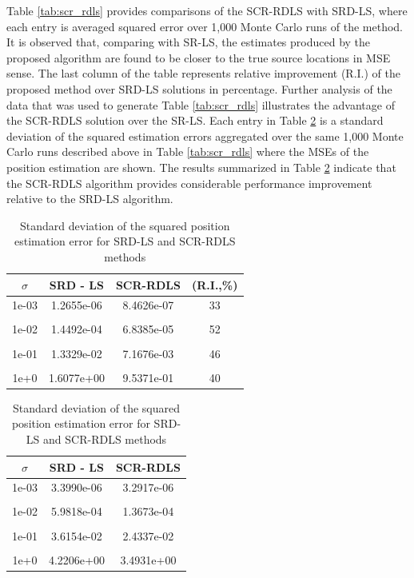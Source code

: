 Table \ref{tab:scr_rdls}  provides comparisons of the SCR-RDLS with SRD-LS, where each entry is averaged squared error over 1,000 Monte Carlo runs of the method. %
 It is observed that, comparing with SR-LS, the estimates produced by the proposed algorithm are found to be closer to the true source locations in MSE sense. The last column of the table  represents relative improvement (R.I.) of the proposed method over SRD-LS solutions in percentage. Further analysis of the data that was used to generate Table \ref{tab:scr_rdls} illustrates the advantage of the SCR-RDLS solution over the SR-LS. 
Each entry in Table \ref{tab:rdls} is a standard deviation of the squared  estimation errors  aggregated over the  same 1,000 Monte Carlo runs described above in Table \ref{tab:scr_rdls} where the MSEs of the position estimation are shown. The results summarized in Table \ref{tab:rdls} indicate that the SCR-RDLS algorithm provides considerable performance improvement relative to the SRD-LS algorithm.

\phantom{m}

\begin{table}[h]
\centering
\caption{MSE of position estimation for SRD-LS and SCR-RDLS methods}
\phantom{m}
\begin{tabular}{|c|c|c|c|} \hline
\centering
$\sigma$ & SRD - LS & SCR-RDLS & (R.I.,\%)  \\ \hline
1e-03&	1.2655e-06  & 8.4626e-07 &  33 \\ &&&\\
1e-02&	1.4492e-04 &  6.8385e-05 &  52 \\ &&&\\
1e-01&	1.3329e-02 & 7.1676e-03 &   46 \\ &&&\\
1e+0&	1.6077e+00 &  9.5371e-01 &   40  \\ %
\hline
\end{tabular}
\label{tab:scr_rdls}

\phantom{m}

\centering
\caption{Standard deviation of the squared position estimation error for SRD-LS and SCR-RDLS methods}
\phantom{m}
\begin{tabular}{|c|c|c|} \hline
$\sigma$ & SRD - LS & SCR-RDLS  \\ \hline
1e-03&	3.3990e-06 &  3.2917e-06 \\ &&\\
1e-02&	5.9818e-04 &   1.3673e-04 \\ &&\\
1e-01&	3.6154e-02  & 2.4337e-02 \\ &&\\
1e+0&	4.2206e+00 &  3.4931e+00 \\ %
\hline
\end{tabular}
\label{tab:rdls}
\end{table}

\phantom{m}

